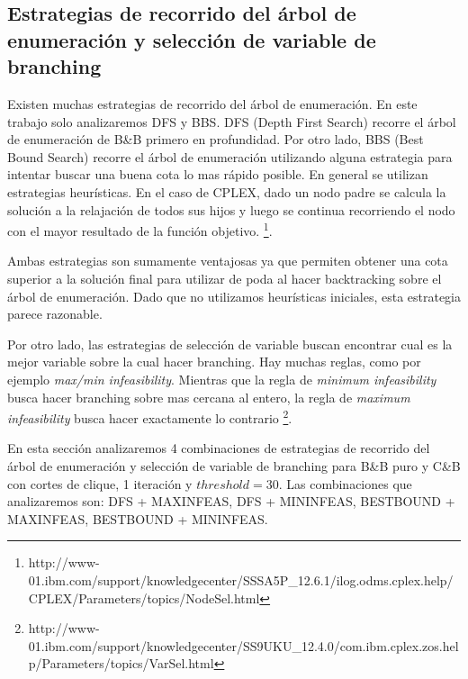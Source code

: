 \pagebreak

\subsection{Estrategias de recorrido del árbol de enumeración
y selección de variable de branching}

Existen muchas estrategias de recorrido del árbol de enumeración. En este trabajo solo analizaremos DFS y BBS. DFS (Depth First Search) recorre el árbol de enumeración de B\&B primero en profundidad. Por otro lado, BBS (Best Bound Search) recorre el árbol de enumeración utilizando alguna estrategia para intentar buscar una buena cota lo mas rápido posible. En general se utilizan estrategias heurísticas. En el caso de CPLEX, dado un nodo padre se calcula la solución a la relajación de todos sus hijos y luego se continua recorriendo el nodo con el mayor resultado de la función objetivo. \footnote{http://www-01.ibm.com/support/knowledgecenter/SSSA5P\_12.6.1/ilog.odms.cplex.help/CPLEX/Parameters/topics/NodeSel.html}.

Ambas estrategias son sumamente ventajosas ya que permiten obtener una cota superior a la solución final para utilizar de poda al hacer backtracking sobre el árbol de enumeración. Dado que no utilizamos heurísticas iniciales, esta estrategia parece razonable. 

Por otro lado, las estrategias de selección de variable buscan encontrar cual es la mejor variable sobre la cual hacer branching. Hay muchas reglas, como por ejemplo \textit{max/min infeasibility}. Mientras que la regla de \textit{minimum infeasibility} busca hacer branching sobre mas cercana al entero, la regla de \textit{maximum infeasibility} busca hacer exactamente lo contrario \footnote{http://www-01.ibm.com/support/knowledgecenter/SS9UKU\_12.4.0/com.ibm.cplex.zos.help/Parameters/topics/VarSel.html}.

En esta sección analizaremos 4 combinaciones de estrategias de recorrido del árbol de enumeración y selección de variable de branching para B\&B puro y C\&B con cortes de clique, 1 iteración y $threshold = 30$. Las combinaciones que analizaremos son: DFS + MAXINFEAS, DFS + MININFEAS, BESTBOUND + MAXINFEAS, BESTBOUND + MININFEAS.

